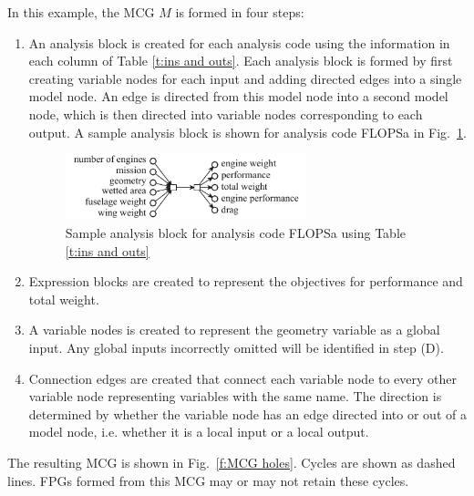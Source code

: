 	In this example, the MCG $M$ is formed in four steps:
	\begin{enumerate}
	\item An analysis block is created for each analysis code using the information in each column of Table \ref{t:ins and outs}. 
	Each analysis block is formed by first creating variable nodes for each input and adding directed edges into a single model node. An edge is directed from this model node into a second model node, which is then directed into variable nodes corresponding to each output. 
	A sample analysis block is shown for analysis code FLOPSa in Fig.~\ref{f:FLOPSb analysis block}.
	\begin{figure}[htb!]
	  \begin{center}
		\includegraphics[width=2.75in]{images/FLOPSa_analysis_block}
	  \end{center}
	  \caption{Sample analysis block for analysis code FLOPSa using Table \ref{t:ins and outs}}
	\label{f:FLOPSb analysis block}
	\end{figure}

	\item Expression blocks are created to represent the objectives for performance and total weight.

	\item A variable nodes is created to represent the geometry variable as a global input. Any global inputs incorrectly omitted will be identified in step (D).

	\item Connection edges are created that connect each variable node to every other variable node representing variables with the same name. 
	The direction is determined by whether the variable node has an edge directed into or out of a model node, i.e. whether it is a local input or a local output.
	\end{enumerate}
	The resulting MCG is shown in Fig.~\ref{f:MCG holes}. 
	Cycles are shown as dashed lines. FPGs formed from this MCG may or may not retain these cycles.
